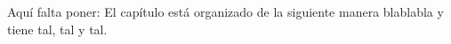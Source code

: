 Aquí falta poner: El capítulo está organizado de la siguiente manera blablabla y tiene tal, tal y tal.






